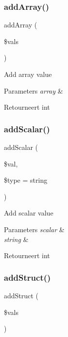 \subsubsection{\texorpdfstring{addArray()}{addArray()}}
{\footnotesize\ttfamily add\+Array (\begin{DoxyParamCaption}\item[{}]{\$vals }\end{DoxyParamCaption})}

Add array value


\begin{DoxyParams}{Parameters}
{\em array} & \\
\hline
\end{DoxyParams}
\begin{DoxyReturn}{Retourneert}
int 
\end{DoxyReturn}
\mbox{\label{class_x_m_l___r_p_c___values_ac847166eee63ab7bfaa8b0e22ae19430}} 
\subsubsection{\texorpdfstring{addScalar()}{addScalar()}}
{\footnotesize\ttfamily add\+Scalar (\begin{DoxyParamCaption}\item[{}]{\$val,  }\item[{}]{\$type = {\ttfamily \textquotesingle{}string\textquotesingle{}} }\end{DoxyParamCaption})}

Add scalar value


\begin{DoxyParams}{Parameters}
{\em scalar} & \\
\hline
{\em string} & \\
\hline
\end{DoxyParams}
\begin{DoxyReturn}{Retourneert}
int 
\end{DoxyReturn}
\mbox{\label{class_x_m_l___r_p_c___values_a5dbdf0121566791a201cd07a3de15531}} 
\subsubsection{\texorpdfstring{addStruct()}{addStruct()}}
{\footnotesize\ttfamily add\+Struct (\begin{DoxyParamCaption}\item[{}]{\$vals }\end{DoxyParamCaption})}


